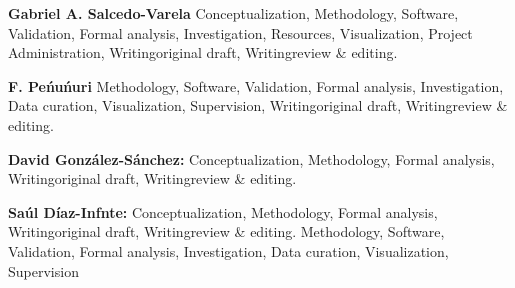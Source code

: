 \textbf{Gabriel A. Salcedo-Varela}
    Conceptualization,
    Methodology,
    Software,
    Validation,
    Formal analysis,
    Investigation,
    Resources,
    Visualization,
    Project Administration,
    Writing\textendash original draft,
    Writing\textendash review \& editing.

\textbf{F. Pe\'nu\'nuri}
    Methodology,
    Software,
    Validation,
    Formal analysis,
    Investigation,
    Data curation,
    Visualization,
    Supervision,
    Writing\textendash original draft,
    Writing\textendash review \& editing.

\textbf{David Gonz\'alez-S\'anchez:}
    Conceptualization,
    Methodology,
    Formal analysis,
    Writing\textendash original draft,
    Writing\textendash review \& editing.

\textbf{Sa\'ul D\'iaz-Infnte:}
    Conceptualization,
    Methodology,
    Formal analysis,
    Writing\textendash original draft,
    Writing\textendash review \& editing.
        Methodology,
    Software,
    Validation,
    Formal analysis,
    Investigation,
    Data curation,
    Visualization,
    Supervision
